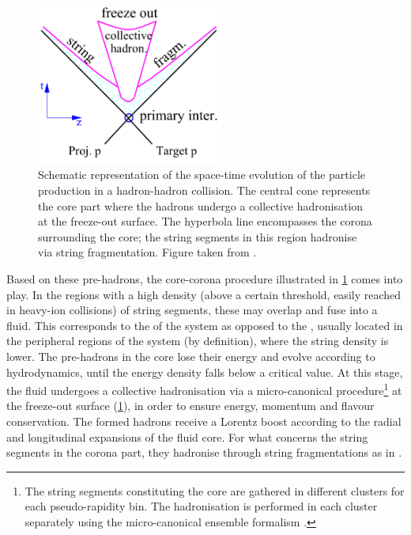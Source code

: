 \begin{figure}[t]
\centering
	\includegraphics[width=0.55\textwidth, valign=t]{Figs/Chapter6/medium.png}
\caption{Schematic representation of the space-time evolution of the particle production in a hadron-hadron collision. The central cone represents the core part where the hadrons undergo a collective hadronisation at the freeze-out surface. The hyperbola line encompasses the corona surrounding the core; the string segments in this region  hadronise via string fragmentation. Figure taken from \cite{pierogEPOSLHCTest2015}.}
	\label{fig:CoreCorona}
\end{figure}

Based on these pre-hadrons, the core-corona procedure illustrated in \fig\ref{fig:CoreCorona} comes into play. In the regions with a high density (above a certain threshold, easily reached in heavy-ion collisions) of string segments, these may overlap and fuse into a fluid. This corresponds to the  of the system as opposed to the , usually located in the peripheral regions of the system (by definition), where the string density is lower. The pre-hadrons in the core lose their energy and evolve according to hydrodynamics, until the energy density falls below a critical value. At this stage, the fluid undergoes a collective hadronisation via a micro-canonical procedure\footnote{The string segments constituting the core are gathered in different clusters for each pseudo-rapidity bin. The hadronisation is performed in each cluster separately using the micro-canonical ensemble formalism \cite{pierogEPOSLHCTest2015}.} at the freeze-out surface (\fig\ref{fig:CoreCorona}), in order to ensure energy, momentum and flavour conservation. The formed hadrons receive a Lorentz boost according to the radial and longitudinal expansions of the fluid core. For what concerns the string segments in the corona part, they hadronise through string fragmentations as in \Pythia.\\

